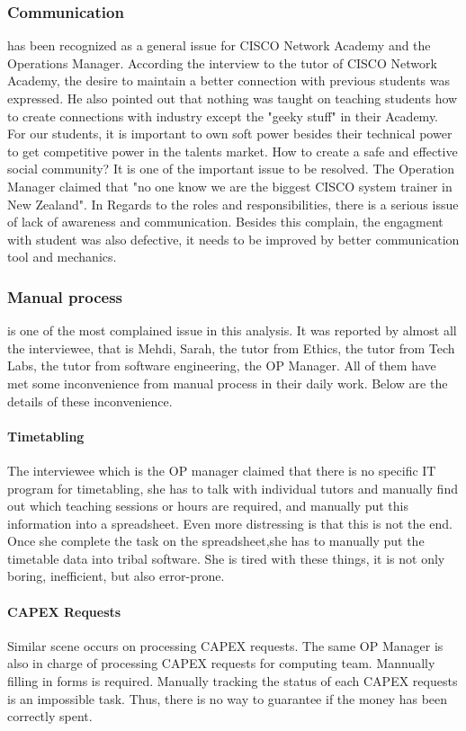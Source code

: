 \subsubsection{Communication} has been recognized as a general issue for CISCO Network Academy and the Operations Manager. According the interview to the tutor of CISCO Network Academy, the desire to maintain a better connection with previous students was expressed. He also pointed out that nothing was taught on teaching students how to create connections with industry except the "geeky stuff" in their Academy. For our students, it is important to own soft power besides their technical power to get competitive power in the talents market. How to create a safe and effective social community? It is one of the important issue to be resolved. The Operation Manager claimed that "no one know we are the biggest CISCO system trainer in New Zealand". In Regards to the roles and responsibilities, there is a serious issue of lack of awareness and communication. Besides this complain, the engagment with student was also defective, it needs to be improved by better communication tool and mechanics.

\subsubsection{Manual process} is one of the most complained issue in this analysis. It was reported by almost all the interviewee, that is Mehdi, Sarah, the tutor from Ethics, the tutor from Tech Labs, the tutor from software engineering, the OP Manager. All of them have met some inconvenience from manual process in their daily work. Below are the details of these inconvenience.

\paragraph{Timetabling} The interviewee which is the OP manager claimed that there is no specific IT program for timetabling, she has to talk with individual tutors and manually find out which teaching sessions or hours are required, and manually put this information into a spreadsheet. Even more distressing is that this is not the end. Once she complete the task on the spreadsheet,she has to manually put the timetable data into tribal software. She is tired with these things, it is not only boring, inefficient, but also error-prone. 

\paragraph{CAPEX Requests} Similar scene occurs on processing CAPEX requests. The same OP Manager is also in charge of processing CAPEX requests for computing team. Mannually filling in forms is required. Manually tracking the status of each CAPEX requests is an impossible task. Thus, there is no way to guarantee if the money has been correctly spent. 

